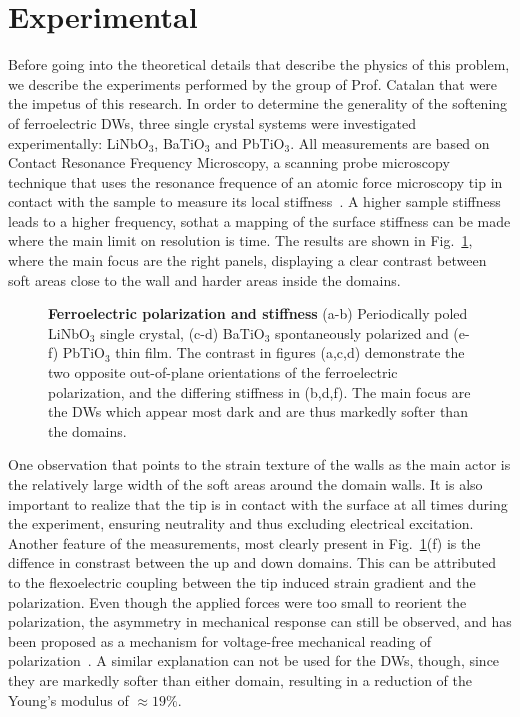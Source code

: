 \section{Experimental}
Before going into the theoretical details that describe the physics of this problem, we describe the experiments performed by the group of Prof. Catalan that were the impetus of this research.
In order to determine the generality of the softening of ferroelectric DWs, three single crystal systems were investigated experimentally: LiNbO$_3$, BaTiO$_3$ and PbTiO$_3$.
All measurements are based on Contact Resonance Frequency Microscopy, a scanning probe microscopy technique that uses the resonance frequence of an atomic force microscopy tip in contact with the sample to measure its local stiffness~\cite{Rabe2000}.
A higher sample stiffness leads to a higher frequency, sothat a mapping of the surface stiffness can be made where the main limit on resolution is time.
The results are shown in Fig.~\ref{fig:BTO_experiment}, where the main focus are the right panels, displaying a clear contrast between soft areas close to the wall and harder areas inside the domains.
\begin{figure}
	\caption{\label{fig:BTO_experiment} {\bf Ferroelectric polarization and stiffness} (a-b) Periodically poled LiNbO$_3$ single crystal, (c-d) BaTiO$_3$ spontaneously polarized and (e-f) PbTiO$_3$ thin film. The contrast in figures (a,c,d) demonstrate the two opposite out-of-plane orientations of the ferroelectric polarization, and the differing stiffness in (b,d,f). The main focus are the DWs which appear most dark and are thus markedly softer than the domains.}
\end{figure}
One observation that points to the strain texture of the walls as the main actor is the relatively large width of the soft areas around the domain walls.
It is also important to realize that the tip is in contact with the surface at all times during the experiment, ensuring neutrality and thus excluding electrical excitation.
Another feature of the measurements, most clearly present in Fig.~\ref{fig:BTO_experiment}(f) is the diffence in constrast between the up and down domains. This can be attributed to the flexoelectric coupling between the tip induced strain gradient and the polarization. Even though the applied forces were too small to reorient the polarization, the asymmetry in mechanical response can still be observed, and has been proposed as a mechanism for voltage-free mechanical reading of polarization~\cite{Cordero-Edwards2017,Cordero-Edwards2019,Abdollahi2015}.
A similar explanation can not be used for the DWs, though, since they are markedly softer than either domain, resulting in a reduction of the Young's modulus of $\approx 19\%$.


